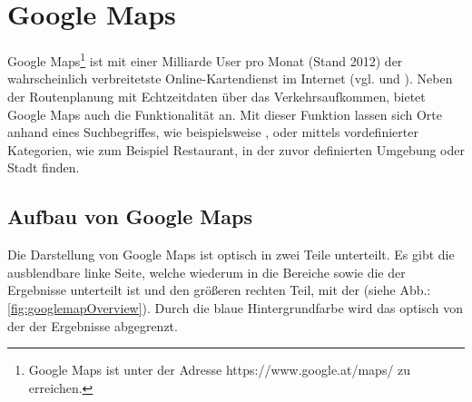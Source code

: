 \documentclass[../Bachelorarbeit.tex]{subfiles}
\begin{document}

\section{Google Maps}
\label{chap:analyse:sec:sota:sec:google_maps}
Google Maps\footnote{
	Google Maps ist unter der Adresse https://www.google.at/maps/ zu erreichen. 
} ist mit einer Milliarde User pro Monat (Stand 2012) der wahrscheinlich verbreitetste Online-Kartendienst im Internet (vgl. \cite{McClendonGoogleMapsBlog} und \cite{McClendonYoutube}).  
Neben der Routenplanung mit Echtzeitdaten über das Verkehrsaufkommen, bietet Google Maps auch die Funktionalität  an.
Mit dieser Funktion lassen sich Orte anhand eines Suchbegriffes, wie beispielsweise , oder mittels vordefinierter Kategorien, wie zum Beispiel Restaurant, in der zuvor definierten Umgebung oder Stadt finden.


\subsection{Aufbau von Google Maps}
Die Darstellung von Google Maps ist optisch in zwei Teile unterteilt.
Es gibt die ausblendbare linke Seite, welche wiederum in die Bereiche  sowie die  der Ergebnisse unterteilt ist und den größeren rechten Teil, mit der  (siehe Abb.: \ref{fig:googlemapOverview}).
Durch die blaue Hintergrundfarbe wird das  optisch von der  der Ergebnisse abgegrenzt.
\end{document}
